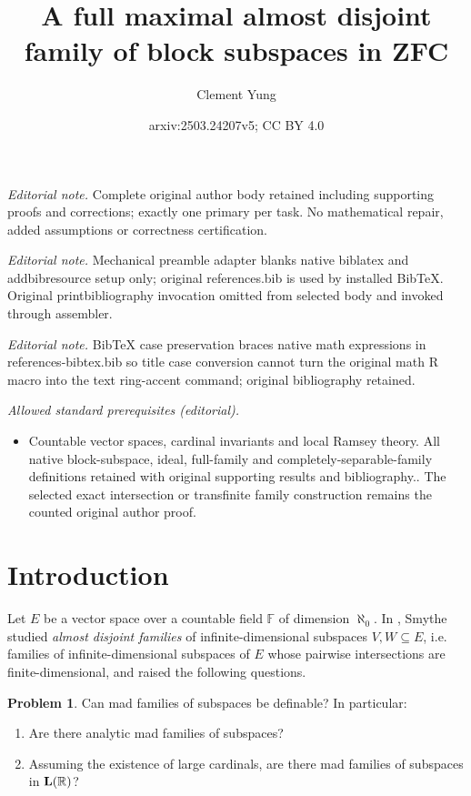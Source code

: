 \documentclass[10pt,a4paper]{amsart}
\title{A full maximal almost disjoint family of block subspaces in ZFC}
\author{Clement Yung}
\date{arxiv:2503.24207v5; CC BY 4.0}
\theoremstyle{plain}
\numberwithin{equation}{section}
\theoremstyle{definition}
\newtheorem{prob}[theorem]{Problem}
\newcommand{\R}{\mathbb{R}}
\let\strokeL\L
\DeclareRobustCommand{\L}{\ifmmode\mathbf{L}\else\strokeL\fi}
\begin{document}
\maketitle
\noindent\textit{Editorial note.} Complete original author body retained including supporting proofs and corrections; exactly one primary per task. No mathematical repair, added assumptions or correctness certification.\par\medskip
\noindent\textit{Editorial note.} Mechanical preamble adapter blanks native biblatex and addbibresource setup only; original references.bib is used by installed BibTeX. Original printbibliography invocation omitted from selected body and invoked through assembler.\par\medskip
\noindent\textit{Editorial note.} BibTeX case preservation braces native math expressions in references-bibtex.bib so title case conversion cannot turn the original math R macro into the text ring-accent command; original bibliography retained.\par\medskip
\noindent\textit{Allowed standard prerequisites (editorial).}\begin{itemize}
\item Countable vector spaces, cardinal invariants and local Ramsey theory. All native block-subspace, ideal, full-family and completely-separable-family definitions retained with original supporting results and bibliography.. The selected exact intersection or transfinite family construction remains the counted original author proof.
\end{itemize}\medskip
\section{Introduction}
\label{sec:intro}


Let $E$ be a vector space over a countable field $\mathbb{F}$ of dimension $\aleph_0$. In \cite{S19}, Smythe studied \emph{almost disjoint families} of infinite-dimensional subspaces $V,W \subseteq E$, i.e. families of infinite-dimensional subspaces of $E$ whose pairwise intersections are finite-dimensional, and raised the following questions.
\begin{prob}
\label{prob:definable.mad.families}
    Can mad families of subspaces be definable? In particular:
    \begin{enumerate}
        \item Are there analytic mad families of subspaces?
        
        \item Assuming the existence of large cardinals, are there mad families of subspaces in $\L(\R)$?
    \end{enumerate}
\end{prob}
\end{document}
